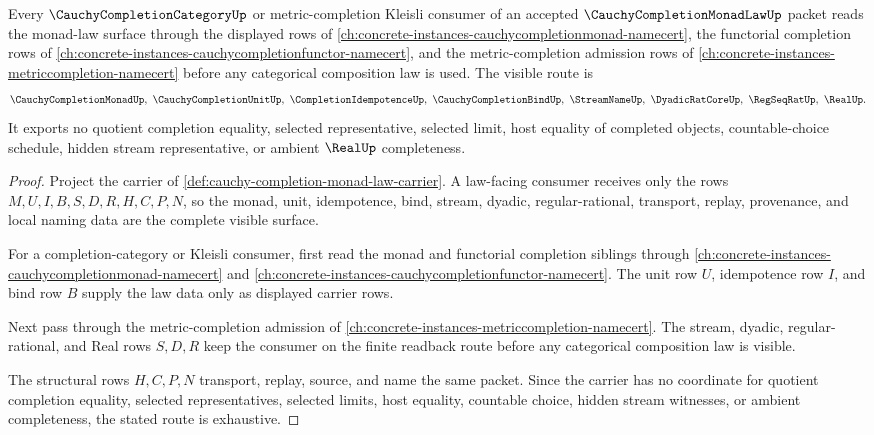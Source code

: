 \begin{theorem}
\label{thm:cauchy-completion-monad-law-forward-orphan-route}
Every $\CauchyCompletionCategoryUp$ or metric-completion Kleisli consumer of an accepted $\CauchyCompletionMonadLawUp$ packet reads the monad-law surface through the displayed rows of \autoref{ch:concrete-instances-cauchycompletionmonad-namecert}, the functorial completion rows of \autoref{ch:concrete-instances-cauchycompletionfunctor-namecert}, and the metric-completion admission rows of \autoref{ch:concrete-instances-metriccompletion-namecert} before any categorical composition law is used. The visible route is
$$
\CauchyCompletionMonadUp,\ \CauchyCompletionUnitUp,\ \CompletionIdempotenceUp,\ \CauchyCompletionBindUp,\ \StreamNameUp,\ \DyadicRatCoreUp,\ \RegSeqRatUp,\ \RealUp .
$$
It exports no quotient completion equality, selected representative, selected limit, host equality of completed objects, countable-choice schedule, hidden stream representative, or ambient $\RealUp$ completeness.
\end{theorem}
\begin{proof}
Project the carrier of \autoref{def:cauchy-completion-monad-law-carrier}. A law-facing consumer receives only the rows $M,U,I,B,S,D,R,H,C,P,N$, so the monad, unit, idempotence, bind, stream, dyadic, regular-rational, transport, replay, provenance, and local naming data are the complete visible surface.

For a completion-category or Kleisli consumer, first read the monad and functorial completion siblings through \autoref{ch:concrete-instances-cauchycompletionmonad-namecert} and \autoref{ch:concrete-instances-cauchycompletionfunctor-namecert}. The unit row $U$, idempotence row $I$, and bind row $B$ supply the law data only as displayed carrier rows.

Next pass through the metric-completion admission of \autoref{ch:concrete-instances-metriccompletion-namecert}. The stream, dyadic, regular-rational, and Real rows $S,D,R$ keep the consumer on the finite readback route before any categorical composition law is visible.

The structural rows $H,C,P,N$ transport, replay, source, and name the same packet. Since the carrier has no coordinate for quotient completion equality, selected representatives, selected limits, host equality, countable choice, hidden stream witnesses, or ambient completeness, the stated route is exhaustive.
\end{proof}
